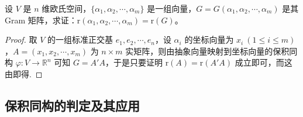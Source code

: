 \documentclass[../../main.tex]{subfiles}
\begin{document}
\begin{proposition}\label{proposition:Gram阵的秩与其生成向量的秩相同-例9.33}
设 \(V\) 是 \(n\) 维欧氏空间，\(\{\alpha_1,\alpha_2,\cdots,\alpha_m\}\) 是一组向量，\(G = G(\alpha_1,\alpha_2,\cdots,\alpha_m)\) 是其 Gram 矩阵，求证：\(\mathrm{r}(\alpha_1,\alpha_2,\cdots,\alpha_m)=\mathrm{r}(G)\)。
\end{proposition}
\begin{proof}
取 \(V\) 的一组标准正交基 \(e_1,e_2,\cdots,e_n\)，设 \(\alpha_i\) 的坐标向量为 \(x_i\ (1\leqslant  i\leqslant  m)\)，\(A=(x_1,x_2,\cdots,x_m)\) 为 \(n\times m\) 实矩阵，则由抽象向量映射到坐标向量的保积同构 \(\varphi:V\rightarrow\mathbb{R}^n\) 可知 \(G = A'A\)，于是只要证明 \(\mathrm{r}(A)=\mathrm{r}(A'A)\) 成立即可，而这由即得.
\end{proof}


\subsection{保积同构的判定及其应用}
\end{document}
